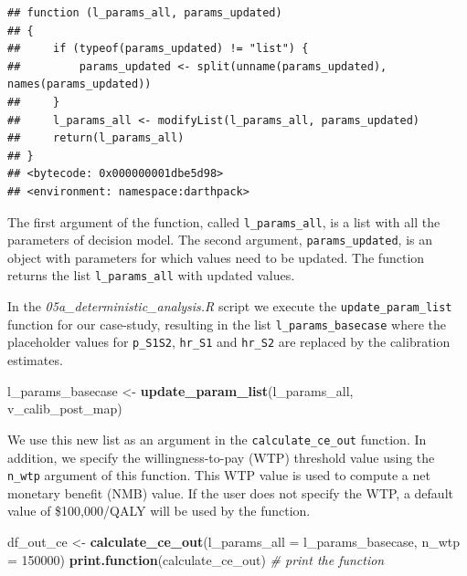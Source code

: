 \documentclass[]{book}
\newenvironment{Shaded}{\begin{snugshade}}{\end{snugshade}}
\newcommand{\CommentTok}[1]{\textcolor[rgb]{0.56,0.35,0.01}{\textit{#1}}}
\newcommand{\DataTypeTok}[1]{\textcolor[rgb]{0.13,0.29,0.53}{#1}}
\newcommand{\DecValTok}[1]{\textcolor[rgb]{0.00,0.00,0.81}{#1}}
\newcommand{\KeywordTok}[1]{\textcolor[rgb]{0.13,0.29,0.53}{\textbf{#1}}}
\newcommand{\NormalTok}[1]{#1}
\newcommand{\StringTok}[1]{\textcolor[rgb]{0.31,0.60,0.02}{#1}}
\begin{document}
\begin{verbatim}
## function (l_params_all, params_updated) 
## {
##     if (typeof(params_updated) != "list") {
##         params_updated <- split(unname(params_updated), names(params_updated))
##     }
##     l_params_all <- modifyList(l_params_all, params_updated)
##     return(l_params_all)
## }
## <bytecode: 0x000000001dbe5d98>
## <environment: namespace:darthpack>
\end{verbatim}

The first argument of the function, called \texttt{l\_params\_all}, is a list with all the parameters of decision model. The second argument, \texttt{params\_updated}, is an object with parameters for which values need to be updated. The function returns the list \texttt{l\_params\_all} with updated values.

In the \emph{05a\_deterministic\_analysis.R} script we execute the \texttt{update\_param\_list} function for our case-study, resulting in the list \texttt{l\_params\_basecase} where the placeholder values for \texttt{p\_S1S2}, \texttt{hr\_S1} and \texttt{hr\_S2} are replaced by the calibration estimates.

\begin{Shaded}
\begin{Highlighting}[]
\NormalTok{l_params_basecase <-}\StringTok{ }\KeywordTok{update_param_list}\NormalTok{(l_params_all, v_calib_post_map) }
\end{Highlighting}
\end{Shaded}

We use this new list as an argument in the \texttt{calculate\_ce\_out} function. In addition, we specify the willingness-to-pay (WTP) threshold value using the \texttt{n\_wtp} argument of this function. This WTP value is used to compute a net monetary benefit (NMB) value. If the user does not specify the WTP, a default value of \$100,000/QALY will be used by the function.

\begin{Shaded}
\begin{Highlighting}[]
\NormalTok{df_out_ce <-}\StringTok{ }\KeywordTok{calculate_ce_out}\NormalTok{(}\DataTypeTok{l_params_all =}\NormalTok{ l_params_basecase, }
                                \DataTypeTok{n_wtp =} \DecValTok{150000}\NormalTok{)}
\KeywordTok{print.function}\NormalTok{(calculate_ce_out) }\CommentTok{# print the function}
\end{Highlighting}
\end{Shaded}
\end{document}
